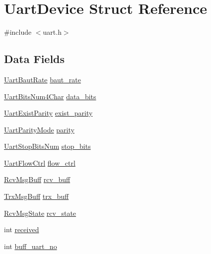 \hypertarget{structUartDevice}{\section{Uart\-Device Struct Reference}
\label{structUartDevice}
}


{\ttfamily \#include $<$uart.\-h$>$}

\subsection*{Data Fields}
\begin{DoxyCompactItemize}
\item 
\hyperlink{uart_8h_a6e376e04a3f78e8319a5dcd9ee6d545d}{Uart\-Baut\-Rate} \hyperlink{structUartDevice_a1a6982e54a4c80d03248d97aa4e7f57c}{baut\-\_\-rate}
\item 
\hyperlink{uart_8h_a1a800ab02eb9805becdea40a047e2e25}{Uart\-Bits\-Num4\-Char} \hyperlink{structUartDevice_ae8f01df67cbdc9fad5e8b66fd03907d6}{data\-\_\-bits}
\item 
\hyperlink{uart_8h_a68b6c81a0e4cc772adaa5217c9b60772}{Uart\-Exist\-Parity} \hyperlink{structUartDevice_ab0dbde04e07cf399428582ce9d8bc43d}{exist\-\_\-parity}
\item 
\hyperlink{uart_8h_acb045cca45821ff8ef1e749914313198}{Uart\-Parity\-Mode} \hyperlink{structUartDevice_aaa1f4b3ac8e9a72e0701105ad7d8078e}{parity}
\item 
\hyperlink{uart_8h_a0ecb1f01cc124cfef8bb7dbfe6c9c1d5}{Uart\-Stop\-Bits\-Num} \hyperlink{structUartDevice_a4c196eb55ccaa09061a843bbe47d29dc}{stop\-\_\-bits}
\item 
\hyperlink{uart_8h_aff0a69149faf310849a6748bc73d73ac}{Uart\-Flow\-Ctrl} \hyperlink{structUartDevice_a7d7e4e0d15a906b2f3c6d4d2febc45a2}{flow\-\_\-ctrl}
\item 
\hyperlink{structRcvMsgBuff}{Rcv\-Msg\-Buff} \hyperlink{structUartDevice_a9daa6a5b871ff1c87427231dff168f41}{rcv\-\_\-buff}
\item 
\hyperlink{structTrxMsgBuff}{Trx\-Msg\-Buff} \hyperlink{structUartDevice_ab83762d1f1257fbbc3ba728520fa0231}{trx\-\_\-buff}
\item 
\hyperlink{uart_8h_a54f1ef96cc154d2f238f56727e0597ba}{Rcv\-Msg\-State} \hyperlink{structUartDevice_a926d7397e6b1c1274d325de1f5d50772}{rcv\-\_\-state}
\item 
int \hyperlink{structUartDevice_af8973705d358fe7d10ab6f3c1382a035}{received}
\item 
int \hyperlink{structUartDevice_af828558385d4b66a04288b5d631f0501}{buff\-\_\-uart\-\_\-no}
\end{DoxyCompactItemize}


